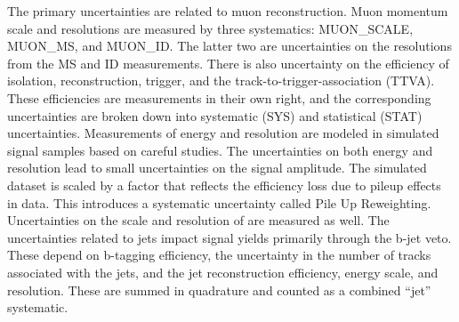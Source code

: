 The primary uncertainties are related to muon reconstruction.
Muon momentum scale and resolutions are measured by three systematics: MUON\_SCALE, MUON\_MS, and MUON\_ID. 
The latter two are uncertainties on the resolutions from the MS and ID measurements.
There is also uncertainty on the efficiency of isolation, reconstruction, trigger, and the track-to-trigger-association (TTVA). \cite{muonReco}
These efficiencies are measurements in their own right, and the corresponding uncertainties are broken down into systematic (SYS) and statistical (STAT) uncertainties.
Measurements of energy and resolution are modeled in simulated signal samples based on careful studies. \cite{elecReco}
The uncertainties on both energy and resolution lead to small uncertainties on the signal amplitude.
The simulated dataset is scaled by a factor that reflects the efficiency loss due to pileup effects in data.
This introduces a systematic uncertainty called Pile Up Reweighting.
Uncertainties on the scale and resolution of \met are measured as well.
The uncertainties related to jets impact signal yields primarily through the b-jet veto.
These depend on b-tagging efficiency, the uncertainty in the number of tracks associated with the jets, and the jet reconstruction efficiency, energy scale, and resolution.
These are summed in quadrature and counted as a combined ``jet'' systematic.

